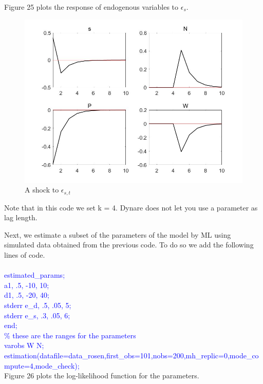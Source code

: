 \documentclass[a4paper,12pt]{scrartcl} %
\begin{document}
Figure 25 plots the response of endogenous variables to $\epsilon_{s}$.

\begin{figure}[htbp!]
		\centering
			\includegraphics[width=0.8\linewidth]{fig26.jpg}
            \caption{A shock to $\epsilon_{s,t}$}\label{26}
\end{figure}

\vspace{4cm}

Note that in this code we set k = 4. Dynare does not let you use a parameter as lag length.

Next, we estimate a subset of the parameters of the model by ML using simulated data obtained from the previous code. To do so we add the following lines of code.\\
\\
\textcolor{blue}{
estimated\_params;\\
a1, .5, -10, 10;\\
d1, .5, -20, 40;\\
stderr e\_d, .5, .05, 5;\\
stderr e\_s, .3, .05, 6; \\
end;\\
\% these are the ranges for the parameters\\
varobs W N;\\
estimation(datafile=data\_rosen,first\_obs=101,nobs=200,mh\_replic=0,mode\_compute=4,mode\_check);}\\

Figure 26 plots the log-likelihood function for the parameters.
\end{document}
